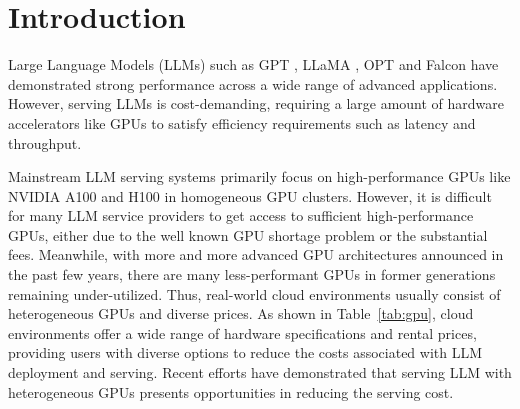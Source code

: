 \section{Introduction}
\label{sec:1_intro}

Large Language Models (LLMs) such as GPT \cite{achiam2023gpt}, LLaMA \cite{touvron2023llama}, OPT \cite{zhang2022opt} and Falcon \cite{falcon180b} have demonstrated strong performance across a wide range of advanced applications. However, serving LLMs is cost-demanding, requiring a large amount of hardware accelerators like GPUs to satisfy efficiency requirements such as latency and throughput.


Mainstream LLM serving systems primarily focus on high-performance GPUs like NVIDIA A100 and H100 in homogeneous GPU clusters. 
However, it is difficult for many LLM service providers to get access to sufficient high-performance GPUs, either due to the well known GPU shortage problem \cite{skypilot,euromlsysworkshop} or the substantial fees. 
Meanwhile, with more and more advanced GPU architectures announced in the past few years, there are many less-performant GPUs in former generations remaining under-utilized.
Thus, real-world cloud environments usually consist of heterogeneous GPUs and diverse prices. As shown in Table~\ref{tab:gpu}, cloud environments offer a wide range of hardware specifications and rental prices, providing users with diverse options to reduce the costs associated with LLM deployment and serving. Recent efforts \cite{jiang2024hexgen,mei2024helix,griggs2024melange,miao2023spotserve} have demonstrated that serving LLM with heterogeneous GPUs presents opportunities in reducing the serving cost.
% 
